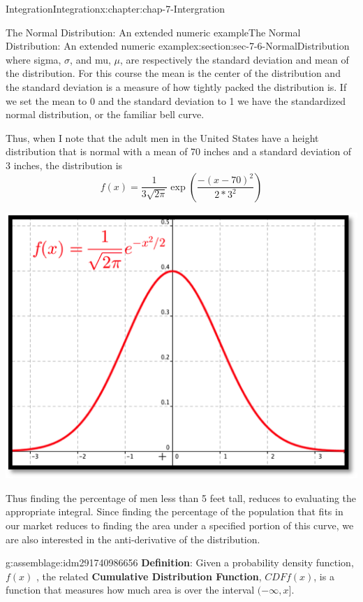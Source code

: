 \documentclass[oneside,10pt,]{book}
\newcommand{\terminology}[1]{\textbf{#1}}
\numberwithin{equation}{section}
\begin{document}
\begin{chapterptx}{Integration}{}{Integration}{}{}{x:chapter:chap-7-Intergration}
\begin{sectionptx}{The Normal Distribution: An extended numeric example}{}{The Normal Distribution: An extended numeric example}{}{}{x:section:sec-7-6-NormalDistribution}
where sigma, \(\sigma\), and mu, \(\mu\), are respectively the standard deviation and mean of the distribution.  For this course the mean is the center of the distribution and the standard deviation is a measure of how tightly packed the distribution is.  If we set the mean to 0 and the standard deviation to 1 we have the standardized normal distribution, or the familiar bell curve.%
\par
Thus, when I note that the adult men in the United States have a height distribution that is normal with a mean of 70 inches and a standard deviation of 3 inches, the distribution is%
%
\begin{equation*}
f(x)=\frac{1}{3\sqrt{2\pi}}\exp\left(\frac{-(x-70)^2}{2*3^2}\right)
\end{equation*}
\begin{sidebyside}{1}{0.25}{0.25}{0}%
\begin{sbspanel}{0.5}%
\includegraphics[width=\linewidth]{images/sec7-6-1.png}
\end{sbspanel}%
\end{sidebyside}%
\par
Thus finding the percentage of men less than 5 feet tall, reduces to evaluating the appropriate integral.  Since finding the percentage of the population that fits in our market reduces to finding the area under a specified portion of this curve, we are also interested in the anti-derivative of the distribution.%
\begin{assemblage}{}{g:assemblage:idm291740986656}%
\terminology{Definition}: Given a probability density function, \(f(x)\) , the related \terminology{Cumulative Distribution Function},  \(CDFf(x)\), is a function that measures how much area is over the interval  \((-\infty,x]\).%

\end{assemblage}
\end{sectionptx}
\end{chapterptx}
\end{document}
